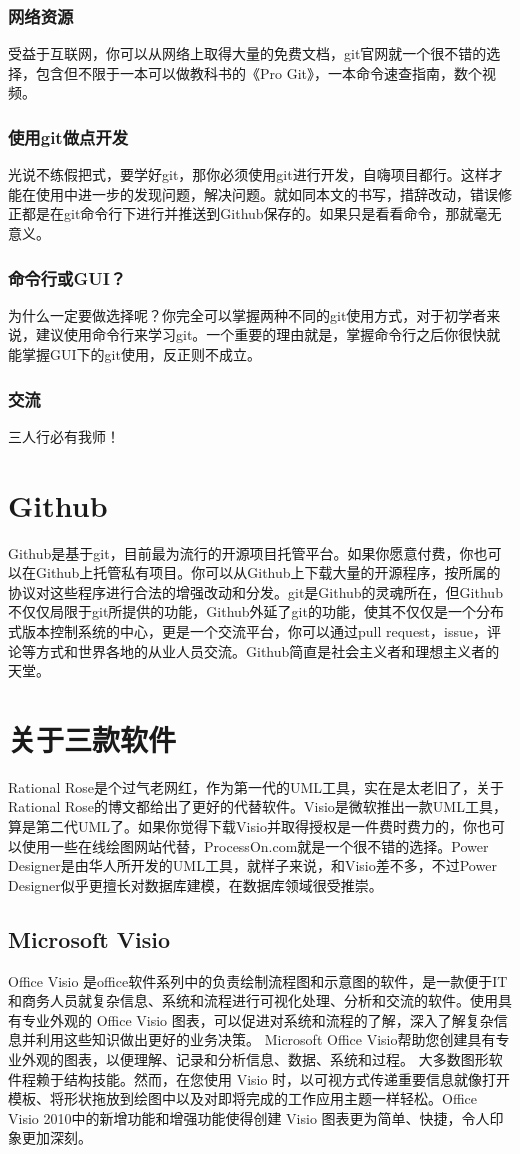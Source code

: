 \documentclass{article}
\begin{document}
	\subsubsection{网络资源}
	受益于互联网，你可以从网络上取得大量的免费文档，git官网就一个很不错的选择，包含但不限于一本可以做教科书的《Pro Git》，一本命令速查指南，数个视频。
	\subsubsection{使用git做点开发}
	光说不练假把式，要学好git，那你必须使用git进行开发，自嗨项目都行。这样才能在使用中进一步的发现问题，解决问题。就如同本文的书写，措辞改动，错误修正都是在git命令行下进行并推送到Github保存的。如果只是看看命令，那就毫无意义。
	\subsubsection{命令行或GUI？}
	为什么一定要做选择呢？你完全可以掌握两种不同的git使用方式，对于初学者来说，建议使用命令行来学习git。一个重要的理由就是，掌握命令行之后你很快就能掌握GUI下的git使用，反正则不成立。
	\subsubsection{交流}
	三人行必有我师！
	\section{Github}
	Github是基于git，目前最为流行的开源项目托管平台。如果你愿意付费，你也可以在Github上托管私有项目。你可以从Github上下载大量的开源程序，按所属的协议对这些程序进行合法的增强改动和分发。git是Github的灵魂所在，但Github不仅仅局限于git所提供的功能，Github外延了git的功能，使其不仅仅是一个分布式版本控制系统的中心，更是一个交流平台，你可以通过pull request，issue，评论等方式和世界各地的从业人员交流。Github简直是社会主义者和理想主义者的天堂。
	\section{关于三款软件}
	Rational Rose是个过气老网红，作为第一代的UML工具，实在是太老旧了，关于Rational Rose的博文都给出了更好的代替软件。Visio是微软推出一款UML工具，算是第二代UML了。如果你觉得下载Visio并取得授权是一件费时费力的，你也可以使用一些在线绘图网站代替，ProcessOn.com就是一个很不错的选择。Power Designer是由华人所开发的UML工具，就样子来说，和Visio差不多，不过Power Designer似乎更擅长对数据库建模，在数据库领域很受推崇。
	\subsection{Microsoft Visio}
	Office Visio 是office软件系列中的负责绘制流程图和示意图的软件，是一款便于IT和商务人员就复杂信息、系统和流程进行可视化处理、分析和交流的软件。使用具有专业外观的 Office Visio 图表，可以促进对系统和流程的了解，深入了解复杂信息并利用这些知识做出更好的业务决策。
	Microsoft Office Visio帮助您创建具有专业外观的图表，以便理解、记录和分析信息、数据、系统和过程。
	大多数图形软件程赖于结构技能。然而，在您使用 Visio 时，以可视方式传递重要信息就像打开模板、将形状拖放到绘图中以及对即将完成的工作应用主题一样轻松。Office Visio 2010中的新增功能和增强功能使得创建 Visio 图表更为简单、快捷，令人印象更加深刻。
\end{document}
